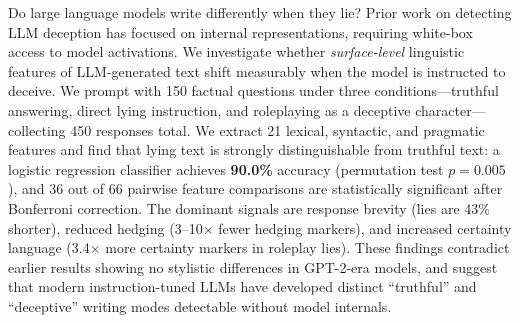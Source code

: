 Do large language models write differently when they lie?
Prior work on detecting LLM deception has focused on internal representations, requiring white-box access to model activations.
We investigate whether \emph{surface-level} linguistic features of LLM-generated text shift measurably when the model is instructed to deceive.
We prompt \gptfour with 150 factual questions under three conditions---truthful answering, direct lying instruction, and roleplaying as a deceptive character---collecting 450 responses total.
We extract 21 lexical, syntactic, and pragmatic features and find that lying text is strongly distinguishable from truthful text: a logistic regression classifier achieves \textbf{90.0\%} accuracy (permutation test $p = 0.005$), and 36 out of 66 pairwise feature comparisons are statistically significant after Bonferroni correction.
The dominant signals are response brevity (lies are 43\% shorter), reduced hedging (3--10$\times$ fewer hedging markers), and increased certainty language (3.4$\times$ more certainty markers in roleplay lies).
These findings contradict earlier results showing no stylistic differences in GPT-2-era models, and suggest that modern instruction-tuned LLMs have developed distinct ``truthful'' and ``deceptive'' writing modes detectable without model internals.
